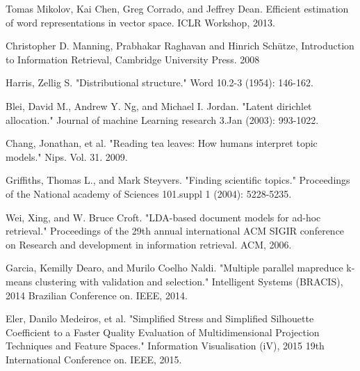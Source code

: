 \documentclass[
	11pt, %
	a4paper, %
	oneside, %
	headinclude,footinclude, %
	BCOR5mm, %
]{scrartcl}
\begin{document}
\begin{thebibliography}{12}

    Tomas Mikolov, Kai Chen, Greg Corrado, and Jeffrey Dean. Efficient estimation of word representations
    in vector space. ICLR Workshop, 2013.

	Christopher D. Manning, Prabhakar Raghavan and Hinrich Schütze, Introduction to Information Retrieval, Cambridge University Press. 2008

	Harris, Zellig S. "Distributional structure." Word 10.2-3 (1954): 146-162.

	Blei, David M., Andrew Y. Ng, and Michael I. Jordan. "Latent dirichlet allocation." Journal of machine Learning research 3.Jan (2003): 993-1022.

	Chang, Jonathan, et al. "Reading tea leaves: How humans interpret topic models." Nips. Vol. 31. 2009.
	
	Griffiths, Thomas L., and Mark Steyvers. "Finding scientific topics." Proceedings of the National academy of Sciences 101.suppl 1 (2004): 5228-5235.

Wei, Xing, and W. Bruce Croft. "LDA-based document models for ad-hoc retrieval." Proceedings of the 29th annual international ACM SIGIR conference on Research and development in information retrieval. ACM, 2006.

	Garcia, Kemilly Dearo, and Murilo Coelho Naldi. "Multiple parallel mapreduce k-means clustering with validation and selection." Intelligent Systems (BRACIS), 2014 Brazilian Conference on. IEEE, 2014.

	Eler, Danilo Medeiros, et al. "Simplified Stress and Simplified Silhouette Coefficient to a Faster Quality Evaluation of Multidimensional Projection Techniques and Feature Spaces." Information Visualisation (iV), 2015 19th International Conference on. IEEE, 2015.

\end{thebibliography}

\end{document}
